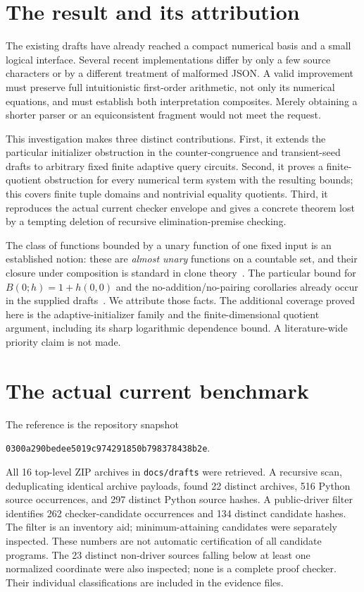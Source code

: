 \documentclass[11pt]{article}
\newcommand{\file}[1]{\texttt{\nolinkurl{#1}}}
\begin{document}
\section{The result and its attribution}

The existing drafts have already reached a compact numerical basis and a
small logical interface. Several recent implementations differ by only a
few source characters or by a different treatment of malformed JSON.
A valid improvement must preserve full intuitionistic first-order
arithmetic, not only its numerical equations, and must establish both
interpretation composites. Merely obtaining a shorter parser or an
equiconsistent fragment would not meet the request.

This investigation makes three distinct contributions. First, it extends
the particular initializer obstruction in the counter-congruence and
transient-seed drafts to arbitrary fixed finite adaptive query circuits.
Second, it proves a finite-quotient obstruction for every numerical term
system with the resulting bounds; this covers finite tuple domains and
nontrivial equality quotients. Third, it reproduces the actual current
checker envelope and gives a concrete theorem lost by a tempting deletion
of recursive elimination-premise checking.

The class of functions bounded by a unary function of one fixed input is
an established notion: these are \emph{almost unary} functions on a
countable set, and their closure under composition is standard in clone
theory~\cite{pinsker}. The particular bound for
$B(0;h)=1+h(0,0)$ and the no-addition/no-pairing corollaries already occur
in the supplied drafts~\cite{counter,transient}. We attribute those facts.
The additional coverage proved here is the adaptive-initializer family
and the finite-dimensional quotient argument, including its sharp
logarithmic dependence bound. A literature-wide priority claim is not
made.

\section{The actual current benchmark}
\label{sec:benchmark}

The reference is the repository snapshot
\begin{center}\small
\file{0300a290bedee5019c974291850b798378438b2e}.
\end{center}
All 16 top-level ZIP archives in \file{docs/drafts} were retrieved. A
recursive scan, deduplicating identical archive payloads, found 22 distinct
archives, 516 Python source occurrences, and 297 distinct Python source
hashes. A public-driver filter identifies 262 checker-candidate occurrences
and 134 distinct candidate hashes. The filter is an inventory aid;
minimum-attaining candidates were separately inspected. These numbers
are not automatic certification of all candidate programs.
The 23 distinct non-driver sources falling below at least one normalized
coordinate were also inspected; none is a complete proof checker.
Their individual classifications are included in the evidence files.
\end{document}

